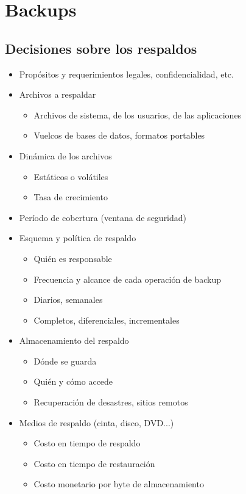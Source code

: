 \section{Backups}
\subsection{Decisiones sobre los respaldos}
\begin{itemize}
	\item Propósitos y requerimientos legales, confidencialidad, etc.
	\item Archivos a respaldar 
	\begin{itemize}
		\item Archivos de sistema, de los usuarios, de las aplicaciones
		\item Vuelcos de bases de datos, formatos portables
	\end{itemize}	
	\item Dinámica de los archivos
	\begin{itemize}
		\item Estáticos o volátiles 
		\item Tasa de crecimiento 
	\end{itemize}
	\item Período de cobertura (ventana de seguridad)
	\item Esquema y política de respaldo 
	\begin{itemize}
		\item Quién es responsable
		\item Frecuencia y alcance de cada operación de backup
		\item Diarios, semanales
		\item Completos, diferenciales, incrementales
	\end{itemize}
	\item Almacenamiento del respaldo 
	\begin{itemize}
		\item Dónde se guarda
		\item Quién y cómo accede
		\item Recuperación de desastres, sitios remotos
	\end{itemize}
	\item Medios de respaldo (cinta, disco, DVD...)
	\begin{itemize}
		\item Costo en tiempo de respaldo
		\item Costo en tiempo de restauración
		\item Costo monetario por byte de almacenamiento 

\end{itemize}
\end{itemize}
